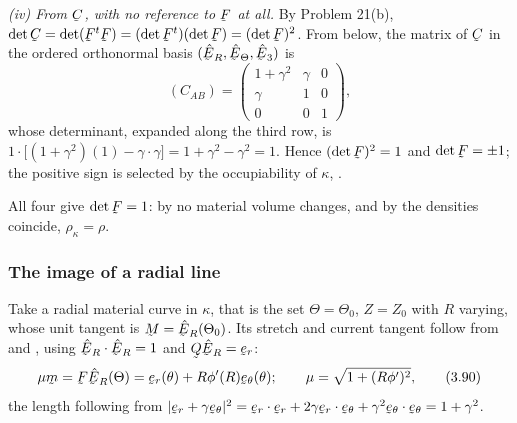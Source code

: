 \smallskip\noindent
\emph{(iv) From $\bC$, with no reference to $\bF$ at all.} By Problem
21(b), $\det\bC=\det(\bF^{t}\bF)=(\det\bF^{t})(\det\bF)=(\det\bF)^{2}$.
From  below, the matrix of $\bC$ in the ordered orthonormal basis
$(\hER,\hETh,\hbE_{3})$ is
\[
   (C_{AB})=\begin{pmatrix}1+\gamma^{2}&\gamma&0\\
   \gamma&1&0\\ 0&0&1\end{pmatrix},
\]
whose determinant, expanded along the third row, is
$1\cdot\big[(1+\gamma^{2})(1)-\gamma\cdot\gamma\big]
=1+\gamma^{2}-\gamma^{2}=1$. Hence $(\det\bF)^{2}=1$ and $\det\bF=\pm1$;
the positive sign is selected by the occupiability of $\kappa$, .

\smallskip\noindent
All four give $\det\bF=1$: by  no material volume changes, and by
 the densities coincide, $\rho_{\kappa}=\rho$.

\subsubsection*{The image of a radial line}

Take a radial material curve in $\kappa$, that is the set
$\Theta=\Theta_{0}$, $Z=Z_{0}$ with $R$ varying, whose unit tangent is
$\bM=\hER(\Theta_{0})$. Its stretch and current tangent follow from
 and , using $\ip{\hER}{\hER}=1$ and
$\bQ\hER=\ber$:
\begin{equation}
   \mu\bm=\bF\hER(\Theta)=\ber(\theta)+R\phi'(R)\bet(\theta);\qquad
   \mu=\sqrt{1+(R\phi')^{2}},
   \tag{3.90}\label{eq:3.90}
\end{equation}
the length following from $|\ber+\gamma\bet|^{2}
=\ip\ber\ber+2\gamma\ip\ber\bet+\gamma^{2}\ip\bet\bet=1+\gamma^{2}$.

